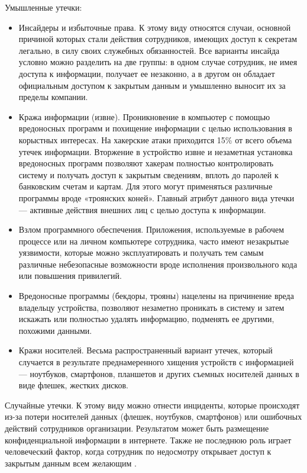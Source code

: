 Умышленные утечки:
\begin{itemize}
    \item Инсайдеры и избыточные права. К этому виду относятся случаи, основной причиной которых
        стали действия сотрудников, имеющих доступ к секретам легально, в силу своих служебных
        обязанностей. Все варианты инсайда условно можно разделить на две группы: в одном случае
        сотрудник, не имея доступа к информации, получает ее незаконно, а в другом он обладает
        официальным доступом к закрытым данным и умышленно выносит их за пределы компании.
    \item Кража информации (извне). Проникновение в компьютер с помощью вредоносных программ и
        похищение информации с целью использования в корыстных интересах. На хакерские атаки
        приходится 15\% от всего объема утечек информации. Вторжение в устройство извне и
        незаметная установка вредоносных программ позволяют хакерам полностью контролировать
        систему и получать доступ к закрытым сведениям, вплоть до паролей к банковским счетам и
        картам. Для этого могут применяться различные программы вроде «троянских коней». Главный
        атрибут данного вида утечки — активные действия внешних лиц с целью доступа к информации.
    \item Взлом программного обеспечения. Приложения, используемые в рабочем процессе или на личном
        компьютере сотрудника, часто имеют незакрытые уязвимости, которые можно эксплуатировать и
        получать тем самым различные небезопасные возможности вроде исполнения произвольного кода или
        повышения привилегий.
    \item Вредоносные программы (бекдоры, трояны) нацелены на причинение вреда владельцу устройства,
        позволяют незаметно проникать в систему и затем искажать или полностью удалять информацию,
        подменять ее другими,  похожими данными.
    \item Кражи носителей. Весьма распространенный вариант утечек, который случается в результате
        преднамеренного хищения устройств с информацией — ноутбуков, смартфонов, планшетов и других
        съемных носителей данных в виде флешек, жестких дисков.
\end{itemize}

Случайные утечки. К этому виду можно отнести инциденты, которые происходят из-за потери носителей
данных (флешек, ноутбуков, смартфонов) или ошибочных действий сотрудников организации. Результатом
может быть размещение конфиденциальной информации в интернете. Также не последнюю роль играет
человеческий фактор, когда сотрудник по недосмотру открывает доступ к закрытым данным всем желающим \cite{leaks}.


